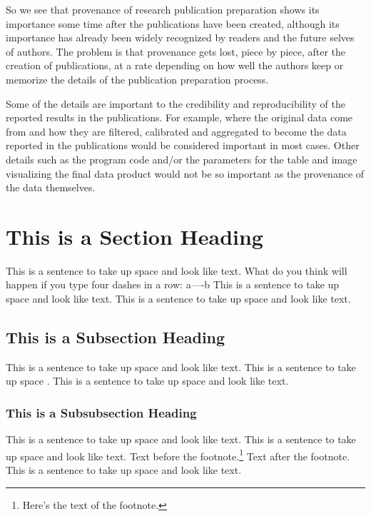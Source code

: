 So we see that provenance of research publication preparation shows its importance some time after the publications have been created, although its importance has already been widely recognized by readers and the future selves of authors. The problem is that provenance gets lost, piece by piece, after the creation of publications, at a rate depending on how well the authors keep or memorize the details of the publication preparation process.

Some of the details are important to the credibility and reproducibility of the reported results in the publications. For example, where the original data come from and how they are filtered, calibrated and aggregated to become the data reported in the publications would be considered important in most cases. Other details such as the program code and/or the parameters for the table and image visualizing the final data product would not be so important as the provenance of the data themselves.



\section{This is a Section Heading}
 
This is a sentence to take up space and look like text.
What do you think will happen if you type four dashes in a row: a----b
This is a sentence to take up space and look like text.
This is a sentence to take up space and look like text.
 
\subsection{This is a Subsection Heading} 
 
This is a sentence to take up space and look like text.
This is a sentence to take up space \cite{anotherbook}.
This is a sentence to take up space and look like text.
 
\subsubsection{This is a Subsubsection Heading}
This is a sentence to take up space and look like text.
This is a sentence to take up space and look like text.
Text before the footnote.\footnote{Here's the text of the footnote.}
Text after the footnote. 
This is a sentence to take up space and look like text.

